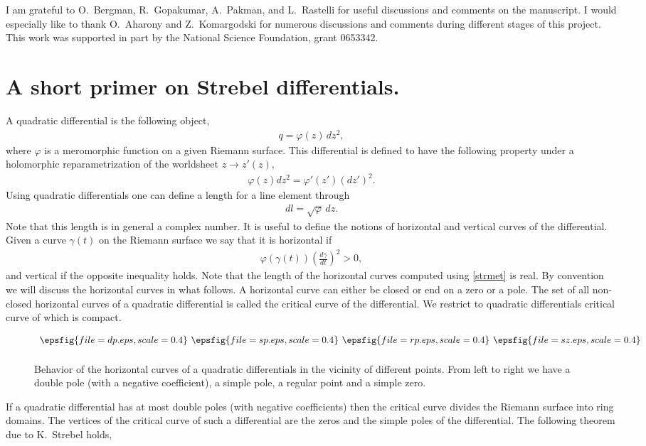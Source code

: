 \documentclass[11pt]{JHEP3}
\def\be{\begin{eqnarray}}
\def\ee{\end{eqnarray}}
\def\g{\gamma}
\def\vf{\varphi}
\def\g{\gamma}
\begin{document}
\acknowledgments 

I am grateful to O.~Bergman, R.~Gopakumar, A.~Pakman, and L.~Rastelli for useful discussions and comments on the manuscript. I would  especially like to thank O.~Aharony and Z.~Komargodski for numerous discussions and comments during different stages of this project. This work was supported in part by the National Science Foundation, grant 0653342.

\appendix

\section{ A short primer on Strebel differentials.}\label{primstr}

A quadratic differential is the following object,
\be
q=\vf(z)\, dz^2,
\ee where $\vf$ is a meromorphic function on a given Riemann surface. This differential is defined to have the following property under a holomorphic reparametrization of the worldsheet
 $z\to z'(z)$,
\be
\vf(z)dz^2=\vf'(z')(dz')^2.
\ee Using quadratic differentials one can define a length for a line element through
\be\label{strmet}
dl=\sqrt{\vf}\,dz.
\ee Note that this length is in general a complex number.
It is useful to define the notions of horizontal and vertical curves of the differential.
Given a curve $\g(t)$ on the Riemann surface we say that it is horizontal if 
\be
\vf(\g(t))\left(\frac{d\g}{d t}\right)^2>0,
\ee and vertical if the opposite inequality holds. Note that the length
of the horizontal curves computed using \eqref{strmet} is real. By convention we will discuss 
the horizontal curves in what follows. A horizontal curve can either be closed or
end on a zero or a pole.  
The set of all non-closed horizontal curves of a quadratic differential is called the critical
curve of the differential. We restrict to quadratic differentials critical curve
of which is compact.
\begin{figure}[htbp]
 \begin{center}
 $\begin{array}{c@{\hspace{0.05in}}c@{\hspace{0.05in}}c@{\hspace{0.05in}}c}
\epsfig{file=dp.eps,scale=0.4} & \epsfig{file=sp.eps,scale=0.4}&\epsfig{file=rp.eps,scale=0.4} &\epsfig{file=sz.eps,scale=0.4}  
\\ [0.2cm]
\end{array}$
\caption{Behavior of the horizontal curves of a quadratic differentials in the vicinity of different points. From left to right we have
a double pole (with a negative coefficient), a simple pole, a regular point and a simple zero.} \label{strebels}
\end{center}
\end{figure}
If a quadratic differential has at most double poles (with negative coefficients)
 then the critical curve divides the Riemann surface into ring domains. The vertices of the critical curve of such a differential are the zeros and the simple poles of the differential.
The following theorem due to K.~Strebel holds,
\end{document}
